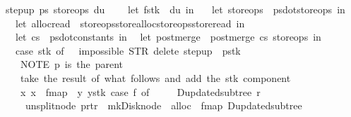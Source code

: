 \begin{isabellebody}
{\isachardoublequoteopen}step{\isacharunderscore}up\ ps{}\ store{\isacharunderscore}ops\ du\ {\isacharequal}\ {\isacharparenleft}\isanewline
\ \ let\ {\isacharparenleft}f{\isacharcomma}stk{\isacharparenright}\ {\isacharequal}\ du\ in\isanewline
\ \ {\isacharparenleft}{\isacharasterisk}\ let\ store{\isacharunderscore}ops\ {\isacharequal}\ ps{}{\isacharbar}{\isachargreater}dot{\isacharunderscore}store{\isacharunderscore}ops\ in\ {\isacharasterisk}{\isacharparenright}\isanewline
\ \ let\ {\isacharparenleft}alloc{\isacharcomma}read{\isacharparenright}\ {\isacharequal}\ {\isacharparenleft}store{\isacharunderscore}ops{\isacharbar}{\isachargreater}store{\isacharunderscore}alloc{\isacharcomma}store{\isacharunderscore}ops{\isacharbar}{\isachargreater}store{\isacharunderscore}read{\isacharparenright}\ in\isanewline
\ \ let\ cs\ {\isacharequal}\ ps{}{\isacharbar}{\isachargreater}dot{\isacharunderscore}constants\ in\isanewline
\ \ let\ post{\isacharunderscore}merge\ {\isacharequal}\ post{\isacharunderscore}merge\ cs\ store{\isacharunderscore}ops\ in\isanewline
\ \ case\ stk\ of\ {\isacharbrackleft}{\isacharbrackright}\ {\isasymRightarrow}\ {\isacharparenleft}impossible{}\ {\isacharparenleft}STR\ {\isacharprime}{\isacharprime}delete{\isacharcomma}\ step{\isacharunderscore}up{\isacharprime}{\isacharprime}{\isacharparenright}{\isacharparenright}\ {\isacharbar}\ p{\isacharhash}stk{\isacharprime}\ {\isasymRightarrow}\ {\isacharparenleft}\isanewline
\ \ {\isacharparenleft}{\isacharasterisk}\ NOTE\ p\ is\ the\ parent\ {\isacharasterisk}{\isacharparenright}\isanewline
\ \ {\isacharparenleft}{\isacharasterisk}\ take\ the\ result\ of\ what\ follows{\isacharcomma}\ and\ add\ the\ stk{\isacharprime}\ component\ {\isacharasterisk}{\isacharparenright}\isanewline
\ \ {\isacharparenleft}{\isacharpercent}\ x{\isachardot}\ x\ {\isacharbar}{\isachargreater}\ fmap\ {\isacharparenleft}{\isacharpercent}\ y{\isachardot}\ {\isacharparenleft}y{\isacharcomma}stk{\isacharprime}{\isacharparenright}{\isacharparenright}{\isacharparenright}\ {\isacharparenleft}case\ f\ of\ \ \ \isanewline
\ \ D{\isacharunderscore}updated{\isacharunderscore}subtree\ r\ {\isasymRightarrow}\ {\isacharparenleft}\isanewline
\ \ \ \ unsplit{\isacharunderscore}node\ {\isacharparenleft}p{\isasymlparr}r{\isacharunderscore}t{\isacharcolon}{\isacharequal}r{\isasymrparr}{\isacharparenright}\ {\isacharbar}{\isachargreater}\ mk{\isacharunderscore}Disk{\isacharunderscore}node\ {\isacharbar}{\isachargreater}\ alloc\ {\isacharbar}{\isachargreater}\ fmap\ D{\isacharunderscore}updated{\isacharunderscore}subtree{\isacharparenright}\isanewline

\end{isabellebody}
